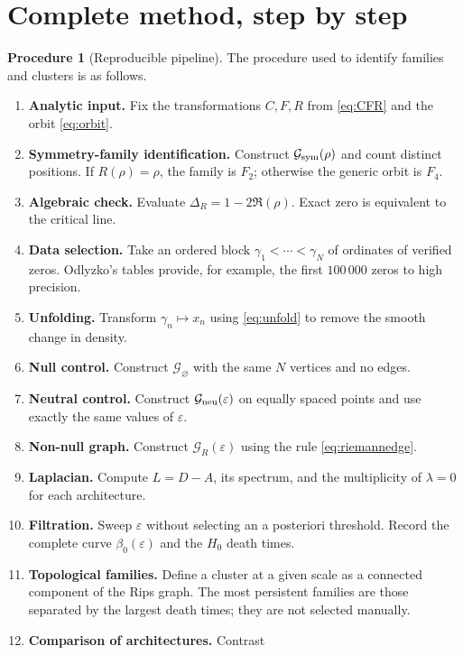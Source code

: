 \documentclass[11pt]{amsart}
\theoremstyle{definition}
\newtheorem{algorithmicdef}[theorem]{Procedure}
\theoremstyle{remark}
\begin{document}
\section{Complete method, step by step}
\begin{algorithmicdef}[Reproducible pipeline]
The procedure used to identify families and clusters is as follows.
\begin{enumerate}[label=\textbf{Step \arabic*.},leftmargin=*]
\item \textbf{Analytic input.} Fix the transformations $C,F,R$ from \eqref{eq:CFR} and the orbit \eqref{eq:orbit}.
\item \textbf{Symmetry-family identification.} Construct $\mathcal G_{\rm sym}(\rho)$ and count distinct positions. If $R(\rho)=\rho$, the family is $F_2$; otherwise the generic orbit is $F_4$.
\item \textbf{Algebraic check.} Evaluate $\Delta_R=1-2\Re(\rho)$. Exact zero is equivalent to the critical line.
\item \textbf{Data selection.} Take an ordered block $\gamma_1<\cdots<\gamma_N$ of ordinates of verified zeros. Odlyzko's tables provide, for example, the first $100\,000$ zeros to high precision.
\item \textbf{Unfolding.} Transform $\gamma_n\mapsto x_n$ using \eqref{eq:unfold} to remove the smooth change in density.
\item \textbf{Null control.} Construct $\mathcal G_{\varnothing}$ with the same $N$ vertices and no edges.
\item \textbf{Neutral control.} Construct $\mathcal G_{\rm neu}(\varepsilon)$ on equally spaced points and use exactly the same values of $\varepsilon$.
\item \textbf{Non-null graph.} Construct $\mathcal G_R(\varepsilon)$ using the rule \eqref{eq:riemannedge}.
\item \textbf{Laplacian.} Compute $L=D-A$, its spectrum, and the multiplicity of $\lambda=0$ for each architecture.
\item \textbf{Filtration.} Sweep $\varepsilon$ without selecting an a posteriori threshold. Record the complete curve $\beta_0(\varepsilon)$ and the $H_0$ death times.
\item \textbf{Topological families.} Define a cluster at a given scale as a connected component of the Rips graph. The most persistent families are those separated by the largest death times; they are not selected manually.
\item \textbf{Comparison of architectures.} Contrast

\end{enumerate}
\end{algorithmicdef}
\end{document}
